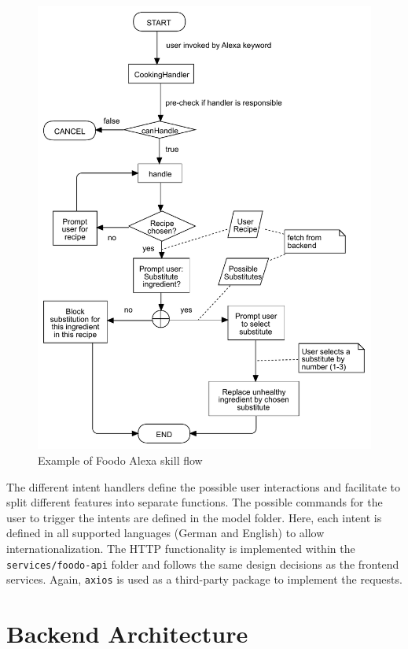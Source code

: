 \begin{figure}[ht]
	\captionsetup{justification=centering}
	\begin{center}
	\includegraphics[scale=0.6]{Ressourcen/img/alexa-flow}
	\caption{Example of Foodo Alexa skill flow}
\end{center}
\end{figure}

The different intent handlers define the possible user interactions and facilitate to split different features into separate functions. The possible commands for the user to trigger the intents are defined in the model folder. Here, each intent is defined in all supported languages (German and English) to allow internationalization. The HTTP functionality is implemented within the \texttt{services/foodo-api} folder and follows the same design decisions as the frontend services. Again, \texttt{axios} is used as a third-party package to implement the requests. 

\section{Backend Architecture}

